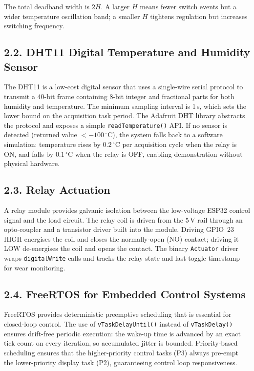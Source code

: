 \documentclass[12pt]{article}
\begin{document}
The total deadband width is $2H$. A larger $H$ means fewer switch events but a wider
temperature oscillation band; a smaller $H$ tightens regulation but increases switching
frequency.

\subsection*{2.2. DHT11 Digital Temperature and Humidity Sensor}

The DHT11 is a low-cost digital sensor that uses a single-wire serial protocol to
transmit a 40-bit frame containing 8-bit integer and fractional parts for both
humidity and temperature. The minimum sampling interval is 1\,s, which sets the lower
bound on the acquisition task period. The Adafruit DHT library abstracts the protocol
and exposes a simple \texttt{readTemperature()} API. If no sensor is detected
(returned value $<-100\,^{\circ}$C), the system falls back to a software simulation:
temperature rises by $0.2\,^{\circ}$C per acquisition cycle when the relay is ON, and
falls by $0.1\,^{\circ}$C when the relay is OFF, enabling demonstration without
physical hardware.

\subsection*{2.3. Relay Actuation}

A relay module provides galvanic isolation between the low-voltage ESP32 control
signal and the load circuit. The relay coil is driven from the 5\,V rail through an
opto-coupler and a transistor driver built into the module. Driving GPIO~23 HIGH
energises the coil and closes the normally-open (NO) contact; driving it LOW
de-energises the coil and opens the contact. The binary \texttt{Actuator} driver
wraps \texttt{digitalWrite} calls and tracks the relay state and last-toggle
timestamp for wear monitoring.

\subsection*{2.4. FreeRTOS for Embedded Control Systems}

FreeRTOS provides deterministic preemptive scheduling that is essential for
closed-loop control. The use of \texttt{vTaskDelayUntil()} instead of
\texttt{vTaskDelay()} ensures drift-free periodic execution: the wake-up time is
advanced by an exact tick count on every iteration, so accumulated jitter is
bounded. Priority-based scheduling ensures that the higher-priority control tasks
(P3) always pre-empt the lower-priority display task (P2), guaranteeing control
loop responsiveness.
\end{document}
